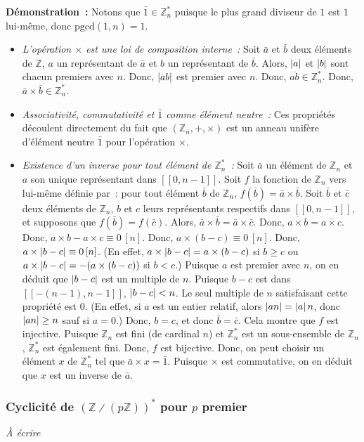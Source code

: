 \noindent
\textbf{Démonstration :} Notons que $\bar{1} \in \mathbb{Z}_n^*$ puisque le plus grand diviseur de $1$ est $1$ lui-même, donc $\mathrm{pgcd}(1, n) = 1$. 
\begin{itemize}[nosep]
    \item \emph{L'opération $\times$ est une loi de composition interne :} Soit $\bar{a}$ et $\bar{b}$ deux éléments de $\mathbb{Z}$, $a$ un représentant de $\bar{a}$ et $b$ un représentant de $\bar{b}$.
        Alors, $\left\lvert a \right\rvert$ et $\left\lvert b \right\rvert$ sont chacun premiers avec $n$.
        Donc, $\left\lvert ab \right\rvert$ est premier avec $n$.
        Donc, $\overline{ab} \in \mathbb{Z}_n^*$.
        Donc, $\bar{a} \times \bar{b} \in \mathbb{Z}_n^*$.
    \item \emph{Associativité, commutativité et $\bar{1}$ comme élément neutre :} Ces propriétés découlent directement du fait que $(\mathbb{Z}_n, +, \times)$ est un anneau unifère d'élément neutre $\bar{1}$ pour l'opération $\times$. 
    \item \emph{Existence d'un inverse pour tout élément de $\mathbb{Z}_n^*$ :}
        Soit $\bar{a}$ un élément de $\mathbb{Z}_n$ et $a$ son unique représentant dans $[\![0, n-1]\!]$. 
        Soit $f$ la fonction de $\mathbb{Z}_n$ vers lui-même définie par : pour tout élément $\bar{b}$ de $\mathbb{Z}_n$, $f(\bar{b}) = \bar{a} \times \bar{b}$.
        Soit $\bar{b}$ et $\bar{c}$ deux éléments de $\mathbb{Z}_n$, $b$ et $c$ leurs représentants respectifs dans $[\![0, n-1]\!]$, et supposons que $f(\bar{b}) = f(\bar{c})$. 
        Alors, $\bar{a} \times \bar{b} = \bar{a} \times \bar{c}$. Donc, $\overline{a \times b} = \overline{a \times c}$.
        Donc, $a \times b - a \times c \equiv 0 \, [n]$.
        Donc, $a \times (b - c) \equiv 0 \, [n]$.
        Donc, $a \times \left\lvert b - c \right\rvert \equiv 0 \, [n]$. (En effet, $a \times \left\lvert b - c \right\rvert = a \times (b - c)$ si $b \geq c$ ou $a \times \left\lvert b - c \right\rvert = -(a \times (b - c))$ si $b < c$.)
        Puisque $a$ est premier avec $n$, on en déduit que $\left\lvert b - c \right\rvert$ est un multiple de $n$.
        Puisque $b-c$ est dans $[\![-(n-1), n-1]\!]$, $\left\lvert b-c \right\rvert < n$. 
        Le seul multiple de $n$ satisfaisant cette propriété est $0$.
        (En effet, si $a$ est un entier relatif, alors $\left\lvert a n \right\rvert = \left\lvert a \right\rvert n$, donc $\left\lvert a n \right\rvert \geq n$ sauf si $a = 0$.)
        Donc, $b = c$, et donc $\bar{b} = \bar{c}$.
        Cela montre que $f$ est injective. 
        Puisque $\mathbb{Z}_n$ est fini (de cardinal $n$) et $\mathbb{Z}_n^*$ est un sous-ensemble de $\mathbb{Z}_n$, $\mathbb{Z}_n^*$ est également fini. 
        Donc, $f$ est bijective. 
        Donc, on peut choisir un élément $x$ de $\mathbb{Z}_n^*$ tel que $\bar{a} \times x = \bar{1}$. 
        Puisque $\times$ est commutative, on en déduit que $x$ est un inverse de $\bar{a}$.
\end{itemize}

\done

\subsubsection{Cyclicité de \texorpdfstring{$\left( \mathbb{Z} \divslash (p \mathbb{Z}) \right)^*$}{(Z / p Z)*} pour \texorpdfstring{$p$}{p} premier}
\label{subsubsec:cyclicity_Z_pZ}

\textit{À écrire}
